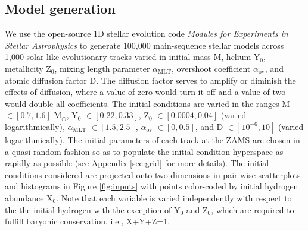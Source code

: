 \documentclass[manuscript]{aastex}
\begin{document}
\subsection{Model generation}
\label{sec:models}
We use the open-source 1D stellar evolution code \emph{Modules for Experiments in Stellar Astrophysics} \citep[MESA,][]{Paxton2011} to generate 100,000 main-sequence stellar models across 1,000 solar-like evolutionary tracks varied in initial mass M, helium Y$_0$, metallicity Z$_0$, mixing length parameter $\alpha_{\text{MLT}}$, overshoot coefficient $\alpha_{\text{ov}}$, and atomic diffusion factor D. The diffusion factor serves to amplify or diminish the effects of diffusion, where a value of zero would turn it off and a value of two would double all coefficients. The initial conditions are varied in the ranges M $\in [0.7, 1.6]$ M$_\odot$, Y$_0$ $\in [0.22, 0.33]$, Z$_0$ $\in [0.0004, 0.04]$ (varied logarithmically), $\alpha_{\text{MLT}}$ $\in [1.5, 2.5]$, $\alpha_{\text{ov}}$ $\in [0, 0.5]$, and D $\in [10^{-6}, 10]$ (varied logarithmically). The initial parameters of each track at the ZAMS are chosen in a quasi-random fashion so as to populate the initial-condition hyperspace as rapidly as possible (see Appendix \ref{sec:grid} for more details). The initial conditions considered are projected onto two dimensions in pair-wise scatterplots and histograms in Figure \ref{fig:inputs} with points color-coded by initial hydrogen abundance X$_0$. Note that each variable is varied independently with respect to the the initial hydrogen with the exception of Y$_0$ and Z$_0$, which are required to fulfill baryonic conservation, i.e., X+Y+Z=1. 
\end{document}
